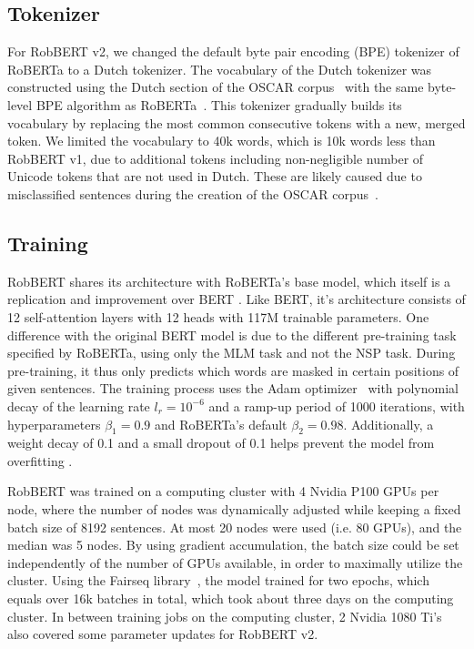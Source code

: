 \documentclass[11pt,a4paper]{article}
\begin{document}
\subsection{Tokenizer}

For RobBERT v2, we changed the default byte pair encoding (BPE) tokenizer of RoBERTa to a Dutch tokenizer.
The vocabulary of the Dutch tokenizer was constructed using the Dutch section of the OSCAR corpus~\citep{ortizsuarezAsynchronous2019} with the same byte-level BPE algorithm as RoBERTa~\citep{liuRoBERTa2019}. This tokenizer gradually builds its vocabulary by replacing the most common consecutive tokens with a new, merged token.
We limited the vocabulary to 40k words, which is 10k words less than RobBERT v1, due to additional tokens including non-negligible number of Unicode tokens that are not used in Dutch.
These are likely caused due to misclassified sentences during the creation of the OSCAR corpus~\citep{ortizsuarezAsynchronous2019}.


\subsection{Training}

RobBERT shares its architecture with RoBERTa's base model, which itself is a replication and improvement over BERT \citep{liuRoBERTa2019}.
Like BERT, it's architecture consists of 12 self-attention layers with 12 heads \citep{devlinBERT2019a} with 117M trainable parameters.
One difference with the original BERT model is due to the different pre-training task specified by RoBERTa, using only the MLM task and not the NSP task.
During pre-training, it thus only predicts which words are masked in certain positions of given sentences.
The training process uses the Adam optimizer~\citep{kingmaAdam2017} with polynomial decay of the learning rate $l_r=10^{-6}$ and a ramp-up period of 1000 iterations, with hyperparameters $\beta_1=0.9$ and RoBERTa's default $\beta_2=0.98$.
Additionally, a weight decay of 0.1 and a small dropout of 0.1 helps prevent the model from overfitting \citep{srivastavaDropout2014}. 


RobBERT was trained on a computing cluster with 4 Nvidia P100 GPUs per node, where the number of nodes was dynamically adjusted while keeping a fixed batch size of 8192 sentences.
At most 20 nodes were used (i.e. 80 GPUs), and the median was 5 nodes. By using gradient accumulation, the batch size could be set independently of the number of GPUs available, in order to maximally utilize the cluster. Using the Fairseq library~\citep{ott2019fairseq}, the model trained for two epochs, which equals over 16k batches in total, which took about three days on the computing cluster.
In between training jobs on the computing cluster, 2 Nvidia 1080 Ti's also covered some parameter updates for RobBERT v2.
\end{document}
